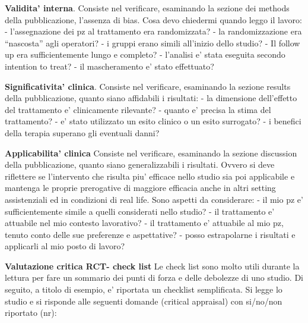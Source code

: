\documentclass[]{book}
\begin{document}
\textbf{Validita' interna}. Consiste nel verificare, esaminando la sezione dei methods della pubblicazione, l'assenza di bias. Cosa devo chiedermi quando leggo il lavoro:
- l'assegnazione dei pz al trattamento era randomizzata?
- la randomizzazione era ``nascosta'' agli operatori?
- i gruppi erano simili all'inizio dello studio?
- Il follow up era sufficientemente lungo e completo?
- l'analisi e' stata eseguita secondo intention to treat?
- il mascheramento e' stato effettuato?

\textbf{Significativita' clinica}. Consiste nel verificare, esaminando la sezione results della pubblicazione, quanto siano affidabili i risultati:
- la dimensione dell'effetto del trattamento e' clinicamente rilevante?
- quanto e' precisa la stima del trattamento?
- e' stato utilizzato un esito clinico o un esito surrogato?
- i benefici della terapia superano gli eventuali danni?

\textbf{Applicabilita' clinica}
Consiste nel verificare, esaminando la sezione discussion della pubblicazione, quanto siano generalizzabili i risultati. Ovvero si deve riflettere se l'intervento che risulta piu' efficace nello studio sia poi applicabile e mantenga le proprie prerogative di maggiore efficacia anche in altri setting assistenziali ed in condizioni di real life. Sono aspetti da considerare:
- il mio pz e' sufficientemente simile a quelli considerati nello studio?
- il trattamento e' attuabile nel mio contesto lavorativo?
- il trattamento e' attuabile al mio pz, tenuto conto delle sue preferenze e aspettative?
- posso estrapolarne i risultati e applicarli al mio posto di lavoro?

\textbf{Valutazione critica RCT- check list}
Le check list sono molto utili durante la lettura per fare un sommario dei punti di forza e delle debolezze di uno studio. Di seguito, a titolo di esempio, e' riportata un checklist semplificata. Si legge lo studio e si risponde alle seguenti domande (critical appraisal) con si/no/non riportato (nr):
\end{document}
